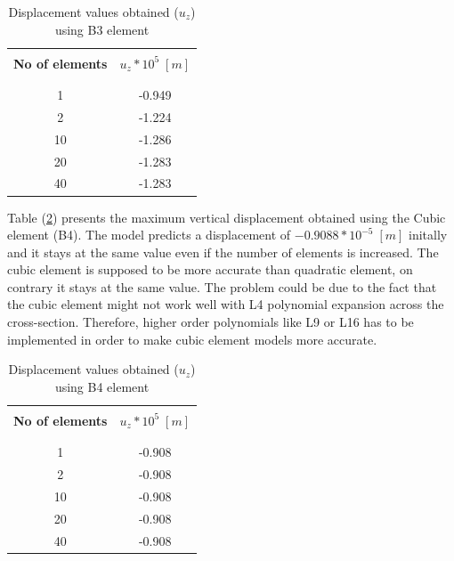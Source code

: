 \documentclass[a4paper,12pt]{article}
\begin{document}
\begin{table}[h!]
  \begin{center}
     \begin{tabular}{c c}
      \hline\\
      \textbf{No of elements} & \textbf{$u_{z}*10^{5}\;[m]$} \\
      \\
      \hline
      \\[-2pt]
       1 & -0.949 \\[5pt]
       2 & -1.224 \\[5pt]
      10 & -1.286 \\[5pt]
      20 & -1.283 \\[5pt]
      40 & -1.283 \\[5pt]

      \hline
     \end{tabular}
    \caption{Displacement values obtained ($u_{z}$) using B3 element}
    \label{tab:table 5}
  \end{center}
\end{table}

Table (\ref{tab:table 6}) presents the maximum vertical displacement obtained using the Cubic element (B4). The model predicts a displacement of $-0.9088*10^{-5}\;[m]$ initally and it stays at the same value even if the number of elements is increased. The cubic element is supposed to be more accurate than quadratic element, on contrary it stays at the same value. The problem could be due to the fact that the cubic element might not work well with L4 polynomial expansion across the cross-section. Therefore, higher order polynomials like L9 or L16 has to be implemented in order to make cubic element models more accurate. 
\begin{table}[h!]
  \begin{center}
     \begin{tabular}{c c}
      \hline\\
      \textbf{No of elements} & \textbf{$u_{z}*10^{5}\;[m]$} \\
      \\
      \hline
      \\[-2pt]
       1 & -0.908 \\[5pt]
       2 & -0.908 \\[5pt]
      10 & -0.908 \\[5pt]
      20 & -0.908 \\[5pt]
      40 & -0.908 \\[5pt]

      \hline
     \end{tabular}
    \caption{Displacement values obtained ($u_{z}$) using B4 element}
    \label{tab:table 6}
  \end{center}
\end{table}
\end{document}
